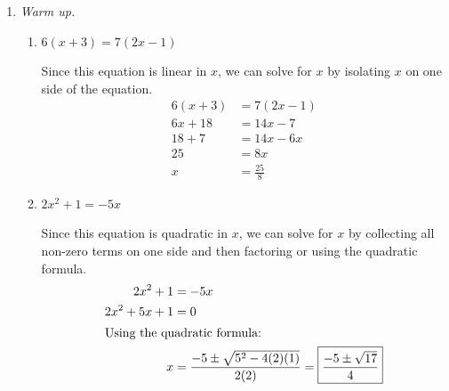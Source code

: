 \documentclass{article}
\begin{document}
\begin{enumerate}[resume]
\item 


  \emph{Warm up.}

    \begin{enumerate}
    \item \label{solve-linear-warmup}
      \begin{problem}
        $6 (x + 3) = 7 (2x - 1)$
      \end{problem}

      \begin{solution}
        Since this equation is linear in $x$,
        we can solve for $x$ by isolating $x$ on one side
        of the equation.
        \begin{align*}
          6(x+3) &= 7(2x-1) \\
          6x + 18 &= 14x - 7 \\
          18 + 7 &= 14x - 6x \\
          25 &= 8x\\
          x &= \boxed{\frac{25}{8}}
        \end{align*}
      \end{solution}

    \item
      \begin{problem}
        $2x^2 + 1 = -5x$
      \end{problem}
      
      \begin{solution}
        Since this equation is quadratic in $x$, we can solve
        for $x$ by collecting all non-zero terms on one side
        and then factoring or using the quadratic formula.
        \begin{align*}
          2x^2+1 &= -5x \\
          2x^2 + 5x + 1 &= 0 \\
          \intertext{Using the quadratic formula:}
          x &= \frac{-5 \pm \sqrt{5^2-4(2)(1)}}{2(2)} = 
          \boxed{\frac{-5 \pm \sqrt{17}}{4}}
        \end{align*}
      \end{solution}


\end{enumerate}
\end{enumerate}
\end{document}
